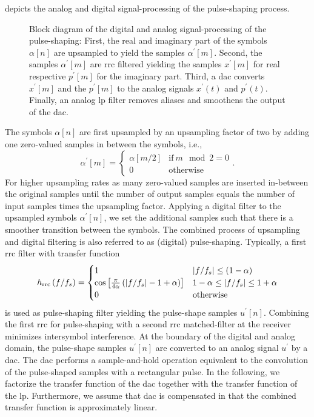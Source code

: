  depicts the analog and digital signal-processing of the pulse-shaping process.
\begin{figure}[htb]
	\centering
	
	\caption{Block diagram of the digital and analog signal-processing of the pulse-shaping: First, the real and imaginary part of the symbols $\alpha[n]$ are upsampled to yield the samples $\alpha^\prime[m]$. Second, the samples $\alpha^\prime[m]$ are \gls{rrc} filtered yielding the samples $x^\prime[m]$ for real respective $p^\prime[m]$ for the imaginary part. Third, a \gls{dac} converts $x^\prime[m]$ and the $p^\prime[m]$ to the analog signals $x^\prime(t)$ and $p^\prime(t)$. Finally, an analog \gls{lp} filter removes aliases and smoothens the output of the \gls{dac}.}\label{fig:pulse_shaping_block}
\end{figure}
The symbols $\alpha[n]$ are first upsampled by an upsampling factor of two by adding one zero-valued samples in between the symbols, i.e.,
\begin{equation}
	\alpha^\prime[m]
	=
	\begin{cases}
		\alpha[m/2] & \text{if}\ m\mod2=0 \\
		0 & \text{otherwise}
	\end{cases}
	.
\end{equation}
For higher upsampling rates as many zero-valued samples are inserted in-between the original samples until the number of output samples equals the number of input samples times the upsampling factor.
Applying a digital filter to the upsampled symbols $\alpha^\prime[n]$, we set the additional samples such that there is a smoother transition between the symbols.
The combined process of upsampling and digital filtering is also referred to as (digital) pulse-shaping.
Typically, a first \gls{rrc} filter with transfer function~\cite[p.~33]{Nossek2015}
\begin{equation}
	h_\text{rrc}\left(f/f_s\right)
	=
	\begin{cases}
		1 & \abs{f/f_s}\leq(1-\alpha) \\
		\cos\left[\frac{\pi}{4\alpha}\left(\abs{f/f_s}-1+\alpha\right)\right] & 1-\alpha\leq\abs{f/f_s}\leq1+\alpha \\
		0 & \text{otherwise}
	\end{cases}
\end{equation}
is used as pulse-shaping filter yielding the pulse-shape samples $u^\prime[n]$.
Combining the first \gls{rrc} for pulse-shaping with a second \gls{rrc} matched-filter at the receiver minimizes intersymbol interference.
At the boundary of the digital and analog domain, the pulse-shape samples $u^\prime[n]$ are converted to an analog signal $u^\prime$ by a \gls{dac}.
The \gls{dac} performs a sample-and-hold operation equivalent to the convolution of the pulse-shaped samples with a rectangular pulse.
In the following, we factorize the transfer function of the \gls{dac} together with the transfer function of the \gls{lp}.
Furthermore, we assume that \gls{dac} is compensated in that the combined transfer function is approximately linear.

